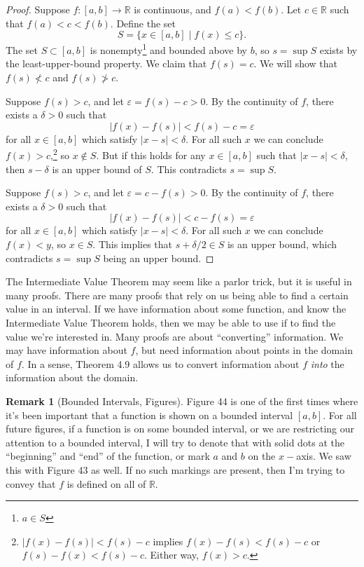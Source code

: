 \documentclass{article}
\newcommand{\R}{\mathbb{R}}
\theoremstyle{definition}
\newtheorem{remark}{Remark}[section]
\begin{document}
\begin{proof}
	Suppose $ f:[a,b]\to\R $ is continuous, and $ f(a)<f(b) $. Let $ c\in\R $ such that $f(a)<c<f(b)$. Define the set $$S=\{x\in[a,b]\mid f(x)\le c\}. $$ The set $ S\subset[a,b] $ is nonempty\footnote{$ a\in S $} and bounded above by $ b $, so $ s=\sup S $ exists by the least-upper-bound property. We claim that $ f(s)=c $. We will show that $ f(s)\not<c $ and $ f(s)\not>c $.
	
	Suppose $ f(s)>c $, and let $ \varepsilon=f(s)-c>0 $. By the continuity of $ f $, there exists a $ \delta>0 $ such that $$ |f(x)-f(s)|<f(s)-c=\varepsilon $$ for all $ x\in[a,b] $ which satisfy $ |x-s|<\delta $. For all such $ x $ we can conclude $ f(x)>c $,\footnote{$ |f(x)-f(s)|<f(s)-c$ implies $ f(x)-f(s)<f(s)-c $ or $ f(s)-f(x)<f(s)-c $. Either way, $ f(x)>c $.} so $ x\notin S $. But if this holds for any $x\in[a,b] $ such that $ |x-s|<\delta $, then $ s-\delta $ is an upper bound of $ S $. This contradicts $ s=\sup S $.
	
	Suppose $ f(s)>c $, and let $ \varepsilon=c-f(s)>0 $. By the continuity of $ f $, there exists a $ \delta>0 $ such that $$ |f(x)-f(s)|<c-f(s)=\varepsilon $$ for all $ x\in[a,b] $ which satisfy $ |x-s|<\delta $. For all such $ x $ we can conclude $ f(x)<y $, so $ x\in S $. This implies that $ s+\delta/2\in S $ is an upper bound, which contradicts $ s=\sup S $ being an upper bound. 
\end{proof}
The Intermediate Value Theorem may seem like a parlor trick, but it is useful in many proofs. There are many proofs that rely on us being able to find a certain value in an interval. If we have information about some function, and know the Intermediate Value Theorem holds, then we may be able to use if to find the value we're interested in. Many proofs are about ``converting'' information. We may have information about $ f $, but need information about points in the domain of $ f $. In a sense, Theorem 4.9 allows us to convert information about $ f $ \textit{into} the information about the domain.  
\begin{remark}[Bounded Intervals, Figures]
	Figure 44 is one of the first times where it's been important that a function is shown on a bounded interval $ [a,b] $. For all future figures, if a function is on some bounded interval, or we are restricting our attention to a bounded interval, I will try to denote that with solid dots at the ``beginning'' and ``end'' of the function, or mark $ a $ and $ b $ on the $ x -$axis. We saw this with Figure 43 as well. If no such markings are present, then I'm trying to convey that $ f $ is defined on all of $ \R $. 
\end{remark}
\end{document}
